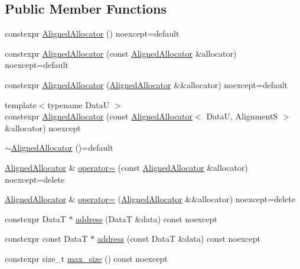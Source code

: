 \subsection*{Public Member Functions}
\begin{DoxyCompactItemize}
\item 
constexpr \hyperlink{structmage_1_1_aligned_allocator_a882b621a8276d046f3300385680442cf}{Aligned\+Allocator} () noexcept=default
\item 
constexpr \hyperlink{structmage_1_1_aligned_allocator_ad5ccaa890d899f8876253a5bfd83a1ba}{Aligned\+Allocator} (const \hyperlink{structmage_1_1_aligned_allocator}{Aligned\+Allocator} \&allocator) noexcept=default
\item 
constexpr \hyperlink{structmage_1_1_aligned_allocator_a5913d9165132c04473673dd0214e8817}{Aligned\+Allocator} (\hyperlink{structmage_1_1_aligned_allocator}{Aligned\+Allocator} \&\&allocator) noexcept=default
\item 
{\footnotesize template$<$typename DataU $>$ }\\constexpr \hyperlink{structmage_1_1_aligned_allocator_a929c971b237449393d7287e2fd0a189a}{Aligned\+Allocator} (const \hyperlink{structmage_1_1_aligned_allocator}{Aligned\+Allocator}$<$ DataU, AlignmentS $>$ \&allocator) noexcept
\item 
\hyperlink{structmage_1_1_aligned_allocator_a98bda5c375a177eaa71cd622622451eb}{$\sim$\+Aligned\+Allocator} ()=default
\item 
\hyperlink{structmage_1_1_aligned_allocator}{Aligned\+Allocator} \& \hyperlink{structmage_1_1_aligned_allocator_a4620c8e53ecc7294ff90d07e956810ed}{operator=} (const \hyperlink{structmage_1_1_aligned_allocator}{Aligned\+Allocator} \&allocator) noexcept=delete
\item 
\hyperlink{structmage_1_1_aligned_allocator}{Aligned\+Allocator} \& \hyperlink{structmage_1_1_aligned_allocator_a0fec7e9e30d91e215d33416dde9ef527}{operator=} (\hyperlink{structmage_1_1_aligned_allocator}{Aligned\+Allocator} \&\&allocator) noexcept=delete
\item 
constexpr DataT $\ast$ \hyperlink{structmage_1_1_aligned_allocator_a7d0757a4532e6511c06b139af0220ed3}{address} (DataT \&data) const noexcept
\item 
constexpr const DataT $\ast$ \hyperlink{structmage_1_1_aligned_allocator_a784654d040a04d0ba048609ceed82432}{address} (const DataT \&data) const noexcept
\item 
constexpr size\+\_\+t \hyperlink{structmage_1_1_aligned_allocator_a66b085ceaf24cdd8400d2ab1167ab02a}{max\+\_\+size} () const noexcept

\end{DoxyCompactItemize}
